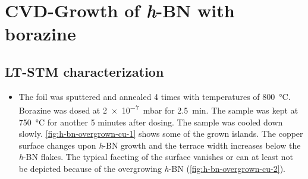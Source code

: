 		
	\section{CVD-Growth of \textit{h}-BN with borazine}
	 \subsection{LT-STM characterization}
	\begin{itemize}
		\item The foil was sputtered and annealed 4 times with temperatures of \SI{800}{\celsius}. Borazine was dosed at \SI{2e-7}{\milli \bar} for \SI{2.5}{\minute}. The sample was kept at \SI{750}{\celsius} for another 5 minutes after dosing. The sample was cooled down slowly. \autoref{fig:h-bn-overgrown-cu-1} shows some of the grown islands. The copper surface changes upon \textit{h}-BN growth and the terrace width increases below the \textit{h}-BN flakes. The typical faceting of the surface vanishes or can at least not be depicted because of the overgrowing \textit{h}-BN (\autoref{fig:h-bn-overgrown-cu-2}). 
	\end{itemize}
	
